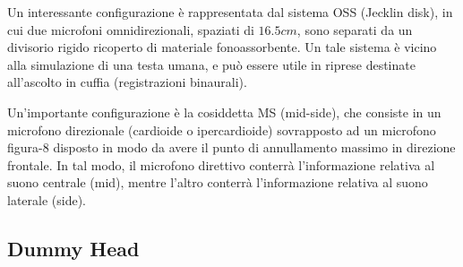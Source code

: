 Un interessante configurazione è rappresentata dal sistema OSS (Jecklin disk),
in cui due microfoni omnidirezionali, spaziati di $16.5cm$, sono separati da un
divisorio rigido ricoperto di materiale fonoassorbente. Un tale sistema è vicino
alla simulazione di una testa umana, e può essere utile in riprese destinate
all’ascolto in cuffia (registrazioni binaurali).

Un’importante configurazione è la cosiddetta MS (mid-side), che consiste in un
microfono direzionale (cardioide o ipercardioide) sovrapposto ad un microfono
figura-8 disposto in modo da avere il punto di annullamento massimo in direzione
frontale. In tal modo, il microfono direttivo conterrà l’informazione relativa
al suono centrale (mid), mentre l’altro conterrà l’informazione relativa al
suono laterale (side).



\subsection{Dummy Head}
